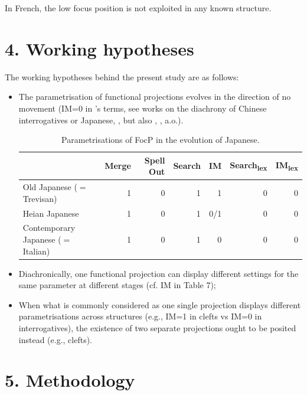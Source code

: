 \documentclass[fleqn,10pt]{wlscirep}
\begin{document}
\noindent In French, the low focus position is not exploited in any known structure.

\section*{4. Working hypotheses}
The working hypotheses behind the present study are as follows:

\begin{itemize}
\item The parametrisation of functional projections evolves in the direction of no movement (IM=0 in \citeauthor{rizzi2017}’s \citeyear{rizzi2017} terms, see works on the diachrony of Chinese interrogatives \citealt{aldridge2010clause} or Japanese, \citealt{aldridge2009old}, but also \citealt{roberts2003syntactic}, \citealt{dadan2019}, a.o.).

\begin{table}[ht]
    \centering
    \begin{tabular}{|l|r|r|r|r|r|r|}
    \hline
     & Merge & Spell Out & Search & IM & Search\textsubscript{lex} & IM\textsubscript{lex} \\
    \hline
    Old Japanese ($=$Trevisan) & 1 & 0 & 1 & 1 & 0 & 0\\
    \hline
    Heian Japanese & 1 & 0 & 1 & 0/1 & 0 & 0 \\
    \hline
    Contemporary Japanese ($=$Italian) & 1 & 0 & 1 & 0 & 0 & 0 \\
    \hline
    \end{tabular}
    \caption{\label{tab:samp2}Parametrisations of FocP in the evolution of Japanese.}
    \end{table}

\item Diachronically, one functional projection can display different settings for the same parameter at different stages (cf. IM in Table 7);

\item When what is commonly considered as one single projection displays different parametrisations across structures (e.g., IM=1 in clefts vs IM=0 in interrogatives), the existence of two separate projections ought to be posited instead (e.g., clefts).
\end{itemize}

\section*{5. Methodology}
\end{document}
